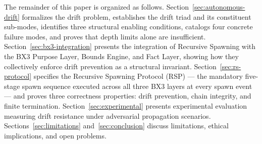The remainder of this paper is organized as follows. Section~\ref{sec:autonomous-drift} formalizes the drift problem, establishes the drift triad and its constituent sub-modes, identifies three structural enabling conditions, catalogs four concrete failure modes, and proves that depth limits alone are insufficient. Section~\ref{sec:bx3-integration} presents the integration of Recursive Spawning with the BX3 Purpose Layer, Bounds Engine, and Fact Layer, showing how they collectively enforce drift prevention as a structural invariant. Section~\ref{sec:rs-protocol} specifies the Recursive Spawning Protocol (RSP) — the mandatory five-stage spawn sequence executed across all three BX3 layers at every spawn event — and proves three correctness properties: drift prevention, chain integrity, and finite termination. Section~\ref{sec:experimental} presents experimental evaluation measuring drift resistance under adversarial propagation scenarios. Sections~\ref{sec:limitations} and~\ref{sec:conclusion} discuss limitations, ethical implications, and open problems.